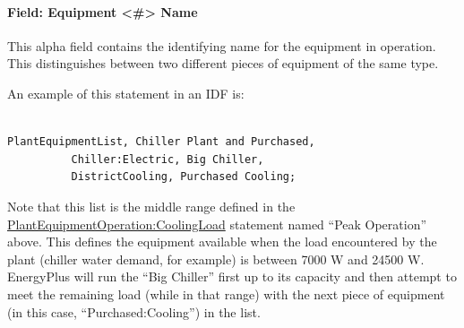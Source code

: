 \paragraph{Field: Equipment \textless{}\#\textgreater{} Name}\label{field-equipment-name-1}

This alpha field contains the identifying name for the equipment in operation. This distinguishes between two different pieces of equipment of the same type.

An example of this statement in an IDF is:

\begin{lstlisting}

PlantEquipmentList, Chiller Plant and Purchased,
          Chiller:Electric, Big Chiller,
          DistrictCooling, Purchased Cooling;
\end{lstlisting}

Note that this list is the middle range defined in the \hyperref[plantequipmentoperationcoolingload]{PlantEquipmentOperation:CoolingLoad} statement named ``Peak Operation'' above. This defines the equipment available when the load encountered by the plant (chiller water demand, for example) is between 7000 W and 24500 W. EnergyPlus will run the ``Big Chiller'' first up to its capacity and then attempt to meet the remaining load (while in that range) with the next piece of equipment (in this case, ``Purchased:Cooling'') in the list.